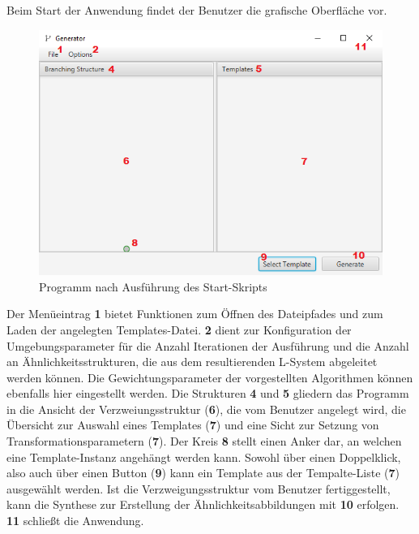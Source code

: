 Beim Start der Anwendung findet der Benutzer die grafische Oberfläche vor.
\begin{figure}[H]
    \centering
    \includegraphics[width=14cm]{../images/UI_numbers1.png}
    \caption{Programm nach Ausführung des Start-Skripts}
\end{figure}
Der Menüeintrag \textbf{1} bietet Funktionen zum Öffnen des Dateipfades und zum Laden der angelegten Templates-Datei.
\textbf{2} dient zur Konfiguration der Umgebungsparameter für die Anzahl Iterationen der Ausführung
und die Anzahl an Ähnlichkeitsstrukturen, die aus dem resultierenden L-System abgeleitet werden können.
Die Gewichtungsparameter der vorgestellten Algorithmen können ebenfalls hier eingestellt werden.
Die Strukturen \textbf{4} und \textbf{5} gliedern das Programm in die Ansicht der Verzweiungsstruktur (\textbf{6}), die vom Benutzer
angelegt wird, die Übersicht zur Auswahl eines Templates (\textbf{7}) und eine Sicht zur Setzung von Transformationsparametern (\textbf{7}).
Der Kreis \textbf{8} stellt einen Anker dar, an welchen eine Template-Instanz angehängt werden kann.
Sowohl über einen Doppelklick, also auch über einen Button (\textbf{9}) kann ein Template aus der Tempalte-Liste (\textbf{7})
ausgewählt werden.
Ist die Verzweigungsstruktur vom Benutzer fertiggestellt, kann die Synthese zur Erstellung der Ähnlichkeitsabbildungen
mit \textbf{10} erfolgen.
\textbf{11} schließt die Anwendung.

